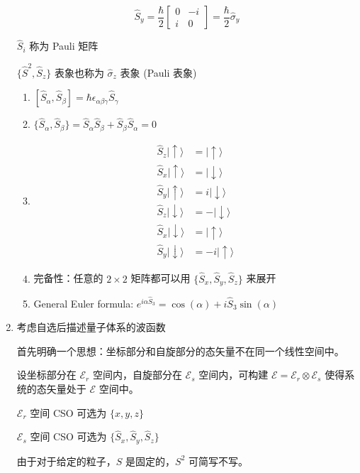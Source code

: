 \documentclass[lang=cn,10pt]{elegantbook}
\begin{document}
\begin{enumerate}
	\[
	\hat{S}_y = \frac{\hbar}{2} \begin{bmatrix} 0 & -i \\ i & 0 \end{bmatrix} = \frac{\hbar}{2} \hat{\sigma}_y
	\]
	
	$\hat{S}_i$ 称为 Pauli 矩阵
	
	$\{\hat{S}^2, \hat{S}_z\}$ 表象也称为 $\hat{\sigma}_z$ 表象 (Pauli 表象)
	
	\begin{enumerate}
		\item $[\hat{S}_\alpha, \hat{S}_\beta] = \hbar \epsilon_{\alpha \beta \gamma} \hat{S}_\gamma$
		\item $\{\hat{S}_\alpha, \hat{S}_\beta\} = \hat{S}_\alpha \hat{S}_\beta + \hat{S}_\beta \hat{S}_\alpha = 0$
		\item
		\begin{align*}
			\hat{S}_z |\uparrow\rangle &= |\uparrow\rangle \\
			\hat{S}_x |\uparrow\rangle &= |\downarrow\rangle \\
			\hat{S}_y |\uparrow\rangle &= i |\downarrow\rangle \\
			\hat{S}_z |\downarrow\rangle &= -|\downarrow\rangle \\
			\hat{S}_x |\downarrow\rangle &= |\uparrow\rangle \\
			\hat{S}_y |\downarrow\rangle &= -i |\uparrow\rangle
		\end{align*}
		\item 完备性：任意的 $2 \times 2$ 矩阵都可以用 $\{\hat{S}_x, \hat{S}_y, \hat{S}_z\}$ 来展开
		\item General Euler formula: $e^{i\alpha \hat{S}_3} = \cos(\alpha) + i \hat{S}_3 \sin(\alpha)$
	\end{enumerate}
	
	\item 考虑自选后描述量子体系的波函数
	
	首先明确一个思想：坐标部分和自旋部分的态矢量不在同一个线性空间中。
	
	设坐标部分在 $\mathcal{E}_r$ 空间内，自旋部分在 $\mathcal{E}_s$ 空间内，可构建 $\mathcal{E} = \mathcal{E}_r \otimes \mathcal{E}_s$ 使得系统的态矢量处于 $\mathcal{E}$ 空间中。
	
	$\mathcal{E}_r$ 空间 CSO 可选为 $\{x, y, z\}$
	
	$\mathcal{E}_s$ 空间 CSO 可选为 $\{\hat{S}_x, \hat{S}_y, \hat{S}_z\}$
	
	由于对于给定的粒子，$S$ 是固定的，$S^2$ 可简写不写。
	

\end{enumerate}
\end{document}
